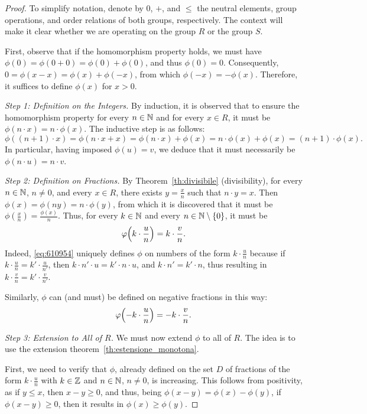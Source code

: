 \begin{proof}
To simplify notation, denote by $0$, $+$, and $\le$ the neutral elements, group
operations, and order relations of both groups, respectively. The context will
make it clear whether we are operating on the group $R$ or the group $S$.

First, observe that if the homomorphism property holds, we must have $\phi(0) =
\phi(0+0) = \phi(0)+\phi(0)$, and thus $\phi(0)=0$. Consequently, $0=\phi(x-x) =
\phi(x)+\phi(-x)$, from which $\phi(-x) = -\phi(x)$. Therefore, it suffices to
define $\phi(x)$ for $x>0$.

\emph{Step 1: Definition on the Integers.} By induction, it is observed that to ensure the homomorphism property for every $n\in {\mathbb N}$ and for every $x\in R$, it must be $\phi(n\cdot x) = n\cdot \phi(x)$. The inductive step is as follows:
\[
  \phi((n+1)\cdot x) 
  = \phi(n\cdot x + x)
  = \phi(n\cdot x) + \phi(x)
  = n\cdot \phi(x) + \phi(x)
  = (n+1)\cdot \phi(x).
\]
In particular, having imposed $\phi(u)=v$, we deduce that it must necessarily be
$\phi(n\cdot u) = n\cdot v$.

\emph{Step 2: Definition on Fractions.} By Theorem~\ref{th:divisibile} (divisibility), for every $n\in {\mathbb N}$, $n\neq 0$, and every $x\in R$, there exists $y=\frac{x}{n}$ such that $n\cdot y=x$. Then $\phi(x) = \phi(ny)=n\cdot \phi(y)$, from which it is discovered that it must be $\phi(\frac x n) = \frac{\phi(x)}{n}$. Thus, for every $k\in {\mathbb N}$ and every $n\in {\mathbb N}\setminus{\left\{ 0 \right\}}$, it must be 
\begin{equation}\label{eq:610954}
  \varphi{\left( k\cdot \frac u n \right)} = k \cdot \frac v n.
\end{equation}
Indeed, \eqref{eq:610954} uniquely defines $\phi$ on numbers of the form $k\cdot
\frac u n$ because if $k\cdot \frac u n = k'\cdot \frac u {n'}$, then $k \cdot
n'\cdot  u = k' \cdot n\cdot u$, and $k\cdot n' = k'\cdot n$, thus resulting in
$k\cdot \frac v n = k'\cdot \frac v {n'}$.

Similarly, $\phi$ can (and must) be defined on negative fractions in this way:
\[
\varphi{\left( -k\cdot \frac u n \right)} = -k\cdot \frac v n.
\]

\emph{Step 3: Extension to All of $R$.} We must now extend $\phi$ to all of $R$. The idea is to use the extension theorem~\ref{th:estensione_monotona}. 

First, we need to verify that $\phi$, already defined on the set $D$ of
fractions of the form $k\cdot \frac u n$ with $k\in {\mathbb Z}$ and $n\in {\mathbb N}$, $n\neq
0$, is increasing. This follows from positivity, as if $y\le x$, then $x-y\ge
0$, and thus, being $\phi(x-y) = \phi(x) - \phi(y)$, if $\phi(x-y)\ge 0$, then
it results in $\phi(x)\ge \phi(y)$.


\end{proof}
